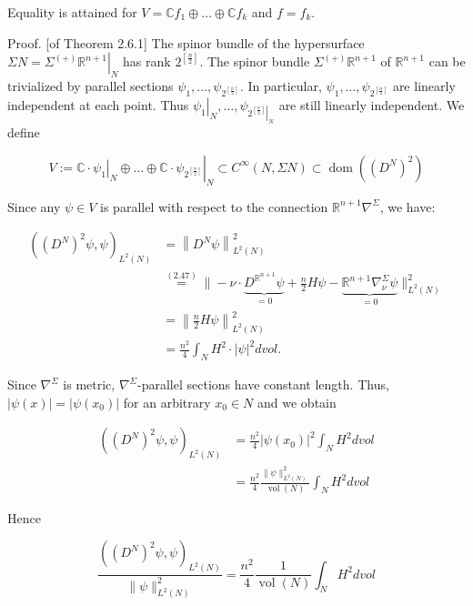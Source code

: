 \documentclass[10pt, letterpaper]{article}
\begin{document}
Equality is attained for $V=\mathbb{C} f_{1} \oplus \ldots \oplus \mathbb{C} f_{k}$ and $f=f_{k}$.

Proof. [of Theorem 2.6.1] The spinor bundle of the hypersurface $\Sigma N=\left.\Sigma^{(+)} \mathbb{R}^{n+1}\right|_{N}$ has rank $2^{\left[\frac{n}{2}\right]}$. The spinor bundle $\Sigma^{(+)} \mathbb{R}^{n+1}$ of $\mathbb{R}^{n+1}$ can be trivialized by parallel sections $\psi_{1}, \ldots, \psi_{2^{\left[\frac{n}{2}\right]}}$. In particular, $\psi_{1}, \ldots, \psi_{2^{\left[\frac{n}{2}\right]}}$ are linearly independent at each point. Thus $\left.\psi_{1}\right|_{N}, \ldots, \psi_{\left.2^{\left[\frac{n}{2}\right]}\right|_{N}}$ are still linearly independent. We define

$$
V:=\left.\left.\mathbb{C} \cdot \psi_{1}\right|_{N} \oplus \ldots \oplus \mathbb{C} \cdot \psi_{2^{\left[\frac{n}{2}\right]}}\right|_{N} \subset C^{\infty}(N, \Sigma N) \subset \operatorname{dom}\left(\left(D^{N}\right)^{2}\right)
$$

Since any $\psi \in V$ is parallel with respect to the connection $\mathbb{R}^{n+1} \nabla^{\Sigma}$, we have:

$$
\begin{aligned}
\left(\left(D^{N}\right)^{2} \psi, \psi\right)_{L^{2}(N)} & =\left\|D^{N} \psi\right\|_{L^{2}(N)}^{2} \\
& \stackrel{(2.47)}{=}\|-\nu \cdot \underbrace{D^{\mathbb{R}^{n+1}} \psi}_{=0}+\frac{n}{2} H \psi-\underbrace{\mathbb{R}^{n+1} \nabla_{\nu}^{\Sigma} \psi}_{=0}\|_{L^{2}(N)}^{2} \\
& =\left\|\frac{n}{2} H \psi\right\|_{L^{2}(N)}^{2} \\
& =\frac{n^{2}}{4} \int_{N} H^{2} \cdot|\psi|^{2} d v o l .
\end{aligned}
$$

Since $\nabla^{\Sigma}$ is metric, $\nabla^{\Sigma}$-parallel sections have constant length. Thus, $|\psi(x)|=\left|\psi\left(x_{0}\right)\right|$ for an arbitrary $x_{0} \in N$ and we obtain

$$
\begin{aligned}
\left(\left(D^{N}\right)^{2} \psi, \psi\right)_{L^{2}(N)} & =\frac{n^{2}}{4}\left|\psi\left(x_{0}\right)\right|^{2} \int_{N} H^{2} d v o l \\
& =\frac{n^{2}}{4} \frac{\|\psi\|_{L^{2}(N)}^{2}}{\operatorname{vol}(N)} \int_{N} H^{2} d v o l
\end{aligned}
$$

Hence

$$
\frac{\left(\left(D^{N}\right)^{2} \psi, \psi\right)_{L^{2}(N)}}{\|\psi\|_{L^{2}(N)}^{2}}=\frac{n^{2}}{4} \frac{1}{\operatorname{vol}(N)} \int_{N} H^{2} d v o l
$$
\end{document}
